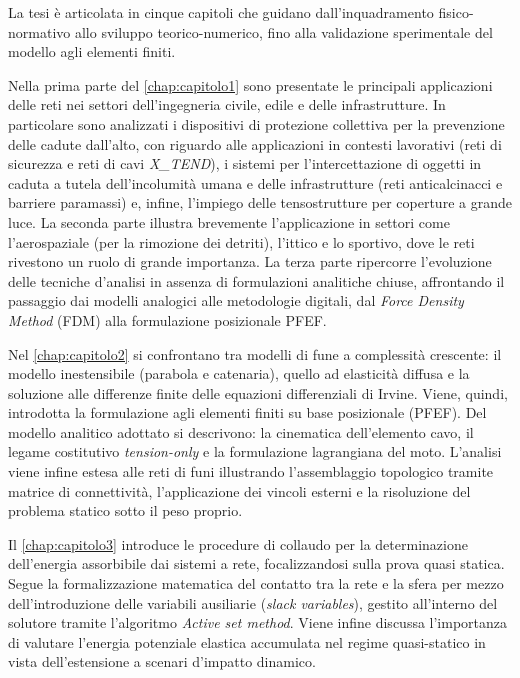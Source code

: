 \documentclass[12pt,a4paper]{report}
\numberwithin{figure}{chapter}
\numberwithin{table}{chapter}
\begin{document}
La tesi è articolata in cinque capitoli che guidano dall'inquadramento fisico-normativo allo sviluppo teorico-numerico, fino alla validazione sperimentale del modello agli elementi finiti.

Nella prima parte del \cref{chap:capitolo1} sono presentate le principali applicazioni delle reti nei settori dell'ingegneria civile, edile e delle infrastrutture. In particolare sono analizzati i dispositivi di protezione collettiva per la prevenzione delle cadute dall'alto, con riguardo alle applicazioni in contesti lavorativi (reti di sicurezza e reti di cavi \textit{X\_TEND}), i sistemi per l'intercettazione di oggetti in caduta a tutela dell'incolumità umana e delle infrastrutture (reti anticalcinacci e barriere paramassi) e, infine, l'impiego delle tensostrutture per coperture a grande luce. La seconda parte illustra brevemente l'applicazione in settori come l'aerospaziale (per la rimozione dei detriti), l'ittico e lo sportivo, dove le reti rivestono un ruolo di grande importanza. La terza parte ripercorre l'evoluzione delle tecniche d'analisi in assenza di formulazioni analitiche chiuse, affrontando il passaggio dai modelli analogici alle metodologie digitali, dal \textit{Force Density Method} (FDM) alla formulazione posizionale PFEF. 

Nel \cref{chap:capitolo2} si confrontano tra modelli di fune a complessità crescente: il modello inestensibile (parabola e catenaria), quello ad elasticità diffusa e la soluzione alle differenze finite delle equazioni differenziali di Irvine. Viene, quindi, introdotta la formulazione agli elementi finiti su base posizionale (PFEF). Del modello analitico adottato si descrivono: la cinematica dell'elemento cavo, il legame costitutivo \textit{tension-only} e la formulazione lagrangiana del moto. L'analisi viene infine estesa alle reti di funi illustrando l'assemblaggio topologico tramite matrice di connettività, l'applicazione dei vincoli esterni e la risoluzione del problema statico sotto il peso proprio. 

Il \cref{chap:capitolo3} introduce le procedure di collaudo per la determinazione dell'energia assorbibile dai sistemi a rete, focalizzandosi sulla prova quasi statica. Segue la formalizzazione matematica del contatto tra la rete e la sfera per mezzo dell'introduzione delle variabili ausiliarie (\textit{slack variables}), gestito all'interno del solutore tramite l'algoritmo \textit{Active set method}. Viene infine discussa l'importanza di valutare l'energia potenziale elastica accumulata nel regime quasi-statico in vista dell'estensione a scenari d'impatto dinamico. 
\end{document}
